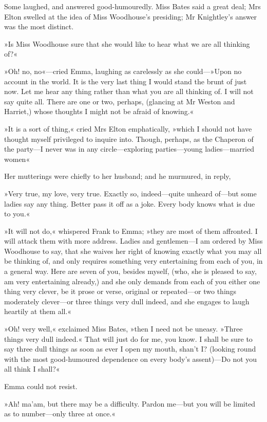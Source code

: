 Some laughed, and answered good-humouredly. Miss Bates said a great deal; Mrs Elton swelled at the idea of Miss Woodhouse's presiding; Mr Knightley's answer was the most distinct.

»Is Miss Woodhouse sure that she would like to hear what we are all thinking of?«

»Oh! no, no«—cried Emma, laughing as carelessly as she could—»Upon no account in the world. It is the very last thing I would stand the brunt of just now. Let me hear any thing rather than what you are all thinking of. I will not say quite all. There are one or two, perhaps, (glancing at Mr Weston and Harriet,) whose thoughts I might not be afraid of knowing.«

»It is a sort of thing,« cried Mrs Elton emphatically, »which I should not have thought myself privileged to inquire into. Though, perhaps, as the Chaperon of the party—I never was in any circle—exploring parties—young ladies—married women\longdash«

Her mutterings were chiefly to her husband; and he murmured, in reply,

»Very true, my love, very true. Exactly so, indeed—quite unheard of—but some ladies say any thing. Better pass it off as a joke. Every body knows what is due to you.«

»It will not do,« whispered Frank to Emma; »they are most of them affronted. I will attack them with more address. Ladies and gentlemen—I am ordered by Miss Woodhouse to say, that she waives her right of knowing exactly what you may all be thinking of, and only requires something very entertaining from each of you, in a general way. Here are seven of you, besides myself, (who, she is pleased to say, am very entertaining already,) and she only demands from each of you either one thing very clever, be it prose or verse, original or repeated—or two things moderately clever—or three things very dull indeed, and she engages to laugh heartily at them all.«

»Oh! very well,« exclaimed Miss Bates, »then I need not be uneasy. »Three things very dull indeed.« That will just do for me, you know. I shall be sure to say three dull things as soon as ever I open my mouth, shan't I? (looking round with the most good-humoured dependence on every body's assent)—Do not you all think I shall?«

Emma could not resist.

»Ah! ma'am, but there may be a difficulty. Pardon me—but you will be limited as to number—only three at once.«

